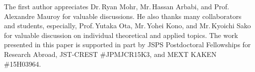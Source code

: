 \documentclass[a4paper,10pt]{article}
\begin{document}
The first author appreciates Dr.\,Ryan Mohr, Mr.\,Hassan Arbabi, and Prof.\,Alexandre Mauroy for valuable discussions. %
He also thanks many collaborators and students, especially, Prof.\,Yutaka Ota, Mr.\,Yohei Kono, and Mr.\,Kyoichi Sako for valuable discussion on individual theoretical and applied topics. 
The work presented in this paper is supported in part by JSPS Postdoctoral Fellowships for Research Abroad, JST-CREST \#JPMJCR15K3, and MEXT KAKEN \#15H03964.  


%
%

\end{document}
